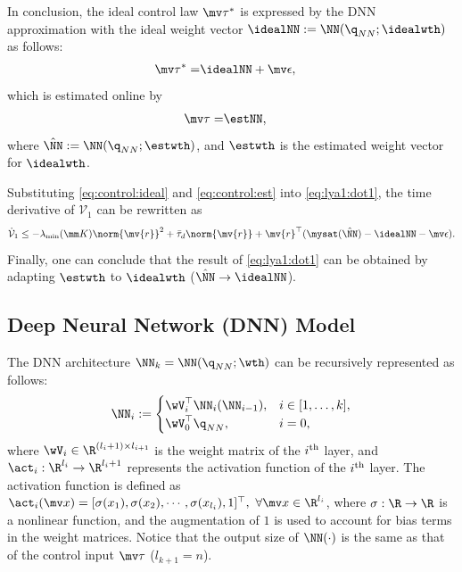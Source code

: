 \documentclass[lettersize,journal]{IEEEtran}
\newcommand*{\fe}{\mv{r}}
\begin{document}
In conclusion, the ideal control law $\mv\tau^*$ is expressed by the DNN approximation with the ideal weight vector $\idealNN:=\NN(\q_{NN};\idealwth)$ as follows:
\begin{align}
    \mv\tau^*=& \idealNN+\mv\epsilon,
    \label{eq:control:ideal}
\end{align}
which is estimated online by
\begin{align}
    \mv\tau =& \estNN,
    \label{eq:control:est}
\end{align}
where $\hat\NN:=\NN(\q_{NN};\estwth)$, and  $\estwth$ is the estimated weight vector for $\idealwth$.

Substituting \eqref{eq:control:ideal} and \eqref{eq:control:est} into \eqref{eq:lya1:dot1}, the time derivative of $\mathcal V_1$ can be rewritten as
\begin{equation}
    \dot{\mathcal V}_1
    \le 
    -\lambda_\text{min}(\mm K)\norm{\fe}^2
    +
    \bar\tau_d\norm{\fe}
    +
    \fe^\top (\mysat(\hat\NN)-\idealNN-\mv\epsilon)
    .
    \label{eq:lya1:dot2}
\end{equation}
Finally, one can conclude that the result of \eqref{eq:lya1:dot1} can be obtained by adapting $\estwth$ to $\idealwth$ (\ie $\hat\NN\to\idealNN$).

\subsection{Deep Neural Network (DNN) Model}\label{sec:sub:NN definition}

The DNN architecture $\NN_k = \NN(\q_{NN};\wth)$ can be recursively represented as follows:
\begin{equation}
    \NN_i :=
    \begin{cases}
        \wV_i^\top \NN_i(\NN_{i-1}), 
        &
        i\in[1,\dots,k],
        \\
        \wV_0^\top \q_{NN},
        &
        i=0
        ,
    \end{cases}
    \label{eq:DNN:architecture}
\end{equation}
where $\wV_i\in\R^{(l_i+1)\times l_{i+1}}$ is the weight matrix of the $i\textsuperscript{th}$ layer, and $\act_i: \R^{l_i}\to\R^{l_i+1}$ represents the activation function of the $i\textsuperscript{th}$ layer. 
The activation function is defined as $\act_i(\mv x)=[\sigma(x_1),\sigma(x_2),\cdots, \sigma(x_{l_{i}}), 1]^\top,\ \forall\mv x\in\R^{l_i}$, where $\sigma: \R\to\R$ is a nonlinear function, and the augmentation of $1$ is used to account for bias terms in the weight matrices. 
Notice that the output size of $\NN(\cdot)$ is the same as that of the control input $\mv\tau$ (\ie $l_{k+1}=n$). 
\end{document}
